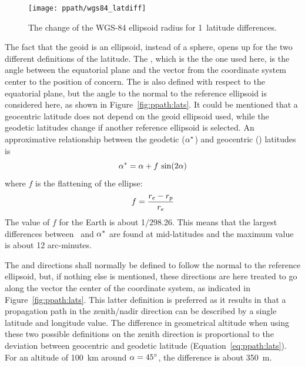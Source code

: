 \begin{figure}[!p]
 \begin{minipage}[c]{0.65\textwidth}
 \texttt{[image: ppath/wgs84\_latdiff]}
 \end{minipage}%
 \begin{minipage}[c]{0.35\textwidth}
  \caption{The change of the WGS-84 ellipsoid radius for  1\degree\ 
            latitude differences.}
  \label{fig:ppath:latdiff}
 \end{minipage}%
\end{figure}   



\label{sec:ppath:geolat}

The fact that the geoid is an ellipsoid, instead of a sphere, opens up
for the two different definitions of the latitude. The
, which is the the one used here, is the
angle between the equatorial plane and the vector from the coordinate
system center to the position of concern. The \textindex{geodetic
  latitude} is also defined with respect to the equatorial plane, but
the angle to the normal to the reference ellipsoid is considered here, as
shown in Figure~\ref{fig:ppath:lats}. It could be mentioned that a
geocentric latitude does not depend on the geoid ellipsoid used, while
the geodetic latitudes change if another reference ellipsoid is
selected. An approximative relationship between the geodetic
($\alpha^*$) and geocentric (\Lat) latitudes is \citep{montenbruck:00}
\begin{equation}
 \alpha^* = \alpha + f\,\sin(2\alpha)  
 \label{eq:ppath:lats}
\end{equation}
where $f$ is the flattening of the ellipse:
\begin{equation}
 f = \frac{r_{e}-r_{p}}{r_{e}}
 \label{eq:ppath:flattening}
\end{equation}
The value of $f$ for the Earth is about 1/298.26. This means that the
largest differences between \Lat\ and $\alpha^*$ are found at
mid-latitudes and the maximum value is about 12 arc-minutes.

The  and  directions shall normally be
defined to follow the normal to the reference ellipsoid, but, if
nothing else is mentioned, these directions are here treated to go
along the vector the center of the coordinate system, as indicated in
Figure~\ref{fig:ppath:lats}. This latter definition is preferred
as it results in that a propagation path in the zenith/nadir direction
can be described by a single latitude and longitude value. The
difference in geometrical altitude when using these two possible
definitions on the zenith direction is proportional to the deviation
between geocentric and geodetic latitude (Equation~\ref{eq:ppath:lats}).
For an altitude of 100~km around $\alpha=45^\circ$, the difference is
about 350~m.


